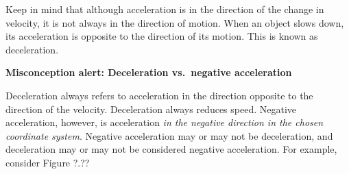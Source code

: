 \documentclass[main-ap-physics.tex]{subfiles}
\begin{document}
Keep in mind that although acceleration is in the direction of the change in velocity, it is not always in the direction of motion. When an object slows down, its acceleration is opposite to the direction of its motion. This is known as \gls{deceleration}.

\vspace{1em} %

\begin{mdframed}[backgroundcolor=yellow!10]
    \textbf{Misconception alert: Deceleration vs.~negative acceleration}

    \vspace{1ex}

    Deceleration always refers to acceleration in the direction opposite to the direction of the velocity. Deceleration always reduces speed. Negative acceleration, however, is acceleration \textit{in the negative direction in the chosen coordinate system}. Negative acceleration may or may not be deceleration, and deceleration may or may not be considered negative acceleration. For example, consider Figure ?.??

    \begin{center}
        \hspace{1cm}


\end{center}
\end{mdframed}
\end{document}
